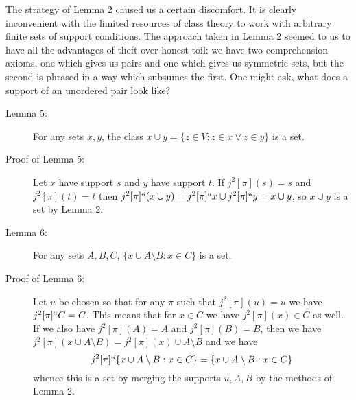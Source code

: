 \documentclass[12pt]{article}
\begin{document}
The strategy of Lemma 2 caused us a certain discomfort.  It is clearly inconvenient with the limited resources of class theory to work with arbitrary finite sets of support conditions.  The approach taken in Lemma 2 seemed to us to have all the advantages of theft over honest toil:  we have two comprehension axioms, one which gives us pairs and one which gives us symmetric sets, but the second is phrased in a way which subsumes the first.  One might ask, what does a support of an unordered pair look like?  

\begin{description}

\item[Lemma 5:]  For any sets $x,y$, the class $x \cup y = \{z \in V:z \in x \vee z\in y\}$ is a set.

\item[Proof of Lemma 5:]  Let $x$ have support $s$ and $y$ have support $t$.  If $j^2[\pi](s)=s$ and $j^2[\pi](t)=t$
then $j^2[\pi]``(x \cup y) = j^2[\pi]``x \cup j^2[\pi]``y = x\cup y$, so $x \cup y$ is a set by Lemma 2.

\item[Lemma 6:]  For any sets $A,B,C$, $\{x \cup A \setminus B:x \in C\}$ is a set.

\item[Proof of Lemma 6:]  Let $u$ be chosen so that for any $\pi$ such that $j^2[\pi](u)=u$ we have $j^2[\pi]``C=C$.
This means that for $x \in C$ we have $j^2[\pi](x)\in C$ as well.  If we also have $j^2[\pi](A)=A$ and $j^2[\pi](B) = B$, then we
have $j^2[\pi](x \cup A \setminus B) = j^2[\pi](x) \cup A \setminus B$ and we have  $$j^2[\pi]``\{x \cup A \setminus B:x \in C\} =\{x \cup A \setminus B:x \in C\}$$ whence this is a set by merging the supports $u,A,B$ by the methods of Lemma 2.

\begin{comment}

\item[Lemma 7:]  Any set $\{a,b\}$ has a support.  The point here is that we present a specific construction of such a support:  this does not allow elimination of the axiom of pairing, alas, because we use the constructions justified by Lemmas 5 and 6 in the proof, which in turn depend on the axiom  of pairing.

\item[Proof of Lemma 7:]  Let $c,d,e,f,g,h$ be distinct sets.  Then the collection $$s=\{\{c\}\} \cup \{\{c,d\}\} \cup \{\{d,e\}\} \cup \{\{e,f\}\} \cup \{\{f,g\}\} \cup \{\{g,h\}\} $$ $$\cup \{u \cup \{c,d,e\}\setminus \{f,g,h\}:u \in a\}\cup \{v \cup \{f,g,h\}\setminus \{c,d,e\}:v \in b\}$$ has the property
that any $j^2[\pi]$ which fixes $s$ also fixes $a$ and $b$, so $j^3[\pi]$ fixes $\{a,b\}$.


\end{comment}
\end{description}
\end{document}
